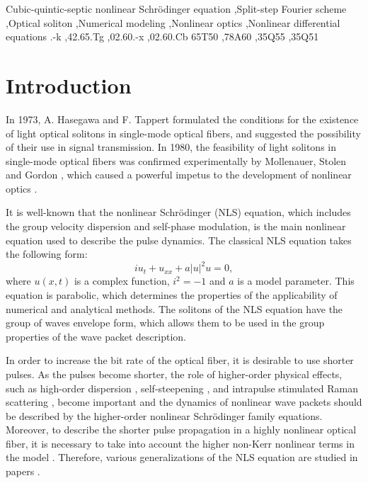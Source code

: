 \documentclass[preprint,12pt]{elsarticle}
\begin{document}
\begin{frontmatter}
\begin{keyword}
Cubic-quintic-septic nonlinear Schr\"{o}dinger equation \sep Split-step Fourier scheme \sep Optical soliton \sep Numerical modeling \sep Nonlinear optics \sep Nonlinear differential equations
.-k \sep 42.65.Tg \sep 02.60.-x \sep 02.60.Cb
\MSC 65T50 \sep 78A60 \sep 35Q55 \sep 35Q51

\end{keyword}

\end{frontmatter}


\section{Introduction}\label{sec0}

In 1973, A. Hasegawa and F. Tappert formulated the conditions for the existence of light optical solitons in single-mode optical fibers, and suggested the possibility of their use in signal transmission\cite{Rad19,Hasegawa1973}.  In 1980, the feasibility of light solitons in single-mode optical fibers was confirmed experimentally by Mollenauer, Stolen and Gordon \cite{Rad01,Rad02}, which caused a powerful impetus to the development of nonlinear optics \cite{Rad14,Rad15,Rad16,Rad03}.

It is well-known that the nonlinear Schr\"{o}dinger (NLS) equation, which includes the group velocity dispersion and self-phase modulation, is the main nonlinear equation used to describe the pulse dynamics. The classical NLS equation takes the following form:
\begin{equation}\label{eq1}
iu_{t}+u_{xx}+a|u|^2 u=0,
\end{equation}
where \(u(x,t)\) is a complex function, \(i^{2}=-1\) and \(a\) is a model parameter. This equation is parabolic, which determines the properties of the applicability of numerical and analytical methods. The solitons of the NLS equation have the group of waves envelope form, which allows them to be used in the group properties of the wave packet description.

In order to increase the bit rate of the optical fiber, it is desirable to use shorter pulses. As the pulses become shorter, the role of higher-order physical effects, such as high-order dispersion \cite{Rad5,Rad8,Rad020,Rad014,Rad016}, self-steepening \cite{UZUNOV2022170137}, and intrapulse stimulated Raman scattering \cite{WANG2022120667,GROMOV201488}, become important and the dynamics of nonlinear wave packets should be described by the higher-order nonlinear Schr\"{o}dinger family equations. Moreover, to describe the shorter pulse propagation in a highly nonlinear optical fiber, it is necessary to take into account the higher non-Kerr nonlinear terms in the model \cite{Rad9,Rad015,Rad017,Rad018,Rad019}. Therefore, various generalizations of the NLS equation are studied in papers \cite{Rad10,Rad11,Rad17,Rad18}. 
\end{document}
